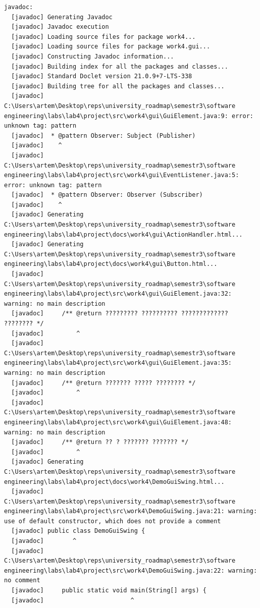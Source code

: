\documentclass[12pt,a4paper]{article}
\begin{document}
\begin{verbatim}
javadoc:
  [javadoc] Generating Javadoc
  [javadoc] Javadoc execution
  [javadoc] Loading source files for package work4...
  [javadoc] Loading source files for package work4.gui...
  [javadoc] Constructing Javadoc information...
  [javadoc] Building index for all the packages and classes...
  [javadoc] Standard Doclet version 21.0.9+7-LTS-338
  [javadoc] Building tree for all the packages and classes...
  [javadoc] C:\Users\artem\Desktop\reps\university_roadmap\semestr3\software engineering\labs\lab4\project\src\work4\gui\GuiElement.java:9: error: unknown tag: pattern
  [javadoc]  * @pattern Observer: Subject (Publisher)
  [javadoc]    ^
  [javadoc] C:\Users\artem\Desktop\reps\university_roadmap\semestr3\software engineering\labs\lab4\project\src\work4\gui\EventListener.java:5: error: unknown tag: pattern
  [javadoc]  * @pattern Observer: Observer (Subscriber)
  [javadoc]    ^
  [javadoc] Generating C:\Users\artem\Desktop\reps\university_roadmap\semestr3\software engineering\labs\lab4\project\docs\work4\gui\ActionHandler.html...
  [javadoc] Generating C:\Users\artem\Desktop\reps\university_roadmap\semestr3\software engineering\labs\lab4\project\docs\work4\gui\Button.html...
  [javadoc] C:\Users\artem\Desktop\reps\university_roadmap\semestr3\software engineering\labs\lab4\project\src\work4\gui\GuiElement.java:32: warning: no main description
  [javadoc]     /** @return ????????? ?????????? ????????????? ???????? */
  [javadoc]         ^
  [javadoc] C:\Users\artem\Desktop\reps\university_roadmap\semestr3\software engineering\labs\lab4\project\src\work4\gui\GuiElement.java:35: warning: no main description
  [javadoc]     /** @return ??????? ????? ???????? */
  [javadoc]         ^
  [javadoc] C:\Users\artem\Desktop\reps\university_roadmap\semestr3\software engineering\labs\lab4\project\src\work4\gui\GuiElement.java:48: warning: no main description
  [javadoc]     /** @return ?? ? ??????? ??????? */
  [javadoc]         ^
  [javadoc] Generating C:\Users\artem\Desktop\reps\university_roadmap\semestr3\software engineering\labs\lab4\project\docs\work4\DemoGuiSwing.html...
  [javadoc] C:\Users\artem\Desktop\reps\university_roadmap\semestr3\software engineering\labs\lab4\project\src\work4\DemoGuiSwing.java:21: warning: use of default constructor, which does not provide a comment
  [javadoc] public class DemoGuiSwing {
  [javadoc]        ^
  [javadoc] C:\Users\artem\Desktop\reps\university_roadmap\semestr3\software engineering\labs\lab4\project\src\work4\DemoGuiSwing.java:22: warning: no comment
  [javadoc]     public static void main(String[] args) {
  [javadoc]                        ^

\end{verbatim}
\end{document}
